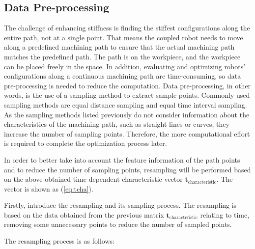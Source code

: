 \subsection{Data Pre-processing} \label{subsec:sec:scheme:process:Data Pre-processing}
The challenge of enhancing stiffness is finding the stiffest configurations along the entire path, not at a single point. That means the coupled robot needs to move along a predefined machining path to ensure that the actual machining path matches the predefined path. The path is on the workpiece, and the workpiece can be placed freely in the space. In addition, evaluating and optimizing robots' configurations along a continuous machining path are time-consuming, so data pre-processing is needed to reduce the computation.
Data pre-processing, in other words, is the use of a sampling method to extract sample points. Commonly used sampling methods are equal distance sampling and equal time interval sampling. As the sampling methods listed previously do not consider information about the characteristics of the machining path, such as straight lines or curves, they increase the number of sampling points. Therefore, the more computational effort is required to complete the optimization process later. \par
In order to better take into account the feature information of the path points and to reduce the number of sampling points, resampling will be performed based on the above obtained time-dependent characteristic vector $\boldsymbol{t_{\mathrm{characteristic}}}$. The vector is shown as (\ref{eq:tcha}). \par
Firstly, introduce the resampling and its sampling process. The resampling is based on the data obtained from the previous matrix $\boldsymbol{t_{\mathrm{characteristic}}}$ relating to time, removing some unnecessary points to reduce the number of sampled points. \par
The resampling process is as follows:
